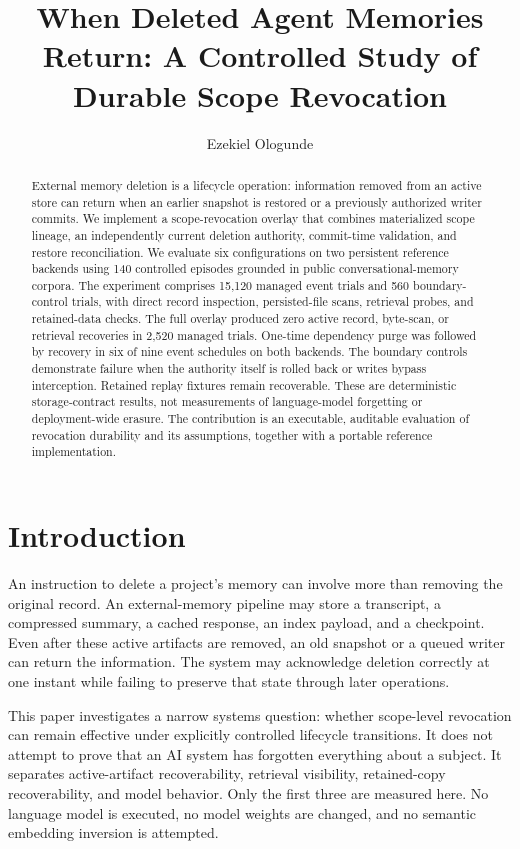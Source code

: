 ﻿\documentclass[sigconf,nonacm]{acmart}
\title{When Deleted Agent Memories Return: A Controlled Study of Durable Scope Revocation}
\author{Ezekiel Ologunde}
\affiliation{%
  \institution{Independent Researcher}
  \city{Boston}
  \state{MA}
  \country{USA}}
\begin{document}
\sloppy
\begin{abstract}
External memory deletion is a lifecycle operation: information removed from an active store can return when an earlier snapshot is restored or a previously authorized writer commits. We implement a scope-revocation overlay that combines materialized scope lineage, an independently current deletion authority, commit-time validation, and restore reconciliation. We evaluate six configurations on two persistent reference backends using 140 controlled episodes grounded in public conversational-memory corpora. The experiment comprises 15,120 managed event trials and 560 boundary-control trials, with direct record inspection, persisted-file scans, retrieval probes, and retained-data checks. The full overlay produced zero active record, byte-scan, or retrieval recoveries in 2,520 managed trials. One-time dependency purge was followed by recovery in six of nine event schedules on both backends. The boundary controls demonstrate failure when the authority itself is rolled back or writes bypass interception. Retained replay fixtures remain recoverable. These are deterministic storage-contract results, not measurements of language-model forgetting or deployment-wide erasure. The contribution is an executable, auditable evaluation of revocation durability and its assumptions, together with a portable reference implementation.
\end{abstract}
\maketitle

\section{Introduction}
An instruction to delete a project's memory can involve more than removing the original record. An external-memory pipeline may store a transcript, a compressed summary, a cached response, an index payload, and a checkpoint. Even after these active artifacts are removed, an old snapshot or a queued writer can return the information. The system may acknowledge deletion correctly at one instant while failing to preserve that state through later operations.

This paper investigates a narrow systems question: whether scope-level revocation can remain effective under explicitly controlled lifecycle transitions. It does not attempt to prove that an AI system has forgotten everything about a subject. It separates active-artifact recoverability, retrieval visibility, retained-copy recoverability, and model behavior. Only the first three are measured here. No language model is executed, no model weights are changed, and no semantic embedding inversion is attempted.
\end{document}
